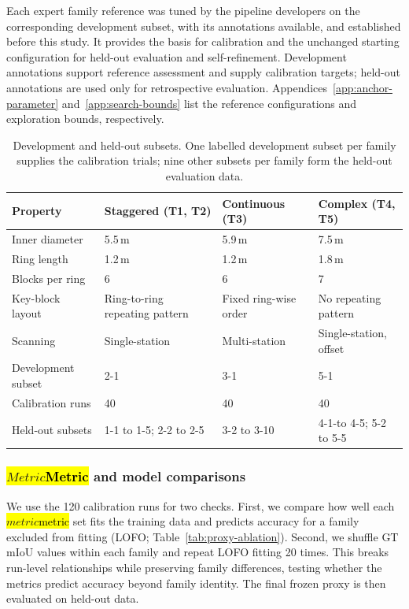 \documentclass[a4paper,fleqn]{cas-dc}
\let\texthl\hl
\renewcommand{\hl}[1]{\ifmmode\colorbox{yellow}{\ensuremath{#1}}\else\texthl{#1}\fi}
\begin{document}
Each expert family reference was tuned by the pipeline developers on the corresponding development subset, with its annotations available, and established before this study. It provides the basis for calibration and the unchanged starting configuration for held-out evaluation and self-refinement. Development annotations support reference assessment and supply calibration targets; held-out annotations are used only for retrospective evaluation. Appendices~\ref{app:anchor-parameter} and~\ref{app:search-bounds} list the reference configurations and exploration bounds, respectively.

\begin{table}[t]
\caption{Development and held-out subsets. One labelled development subset per family supplies the calibration trials; nine other subsets per family form the held-out evaluation data.}
\label{tab:dataset}
\centering
\begin{tabular}{p{} p{} p{} p{}}
\toprule
Property & Staggered (T1, T2) & Continuous (T3) & Complex (T4, T5) \\
\midrule
Inner diameter & 5.5\,m & 5.9\,m & 7.5\,m \\
Ring length & 1.2\,m & 1.2\,m & 1.8\,m \\
Blocks per ring & 6 & 6 & 7 \\
Key-block layout & Ring-to-ring repeating pattern & Fixed ring-wise order & No repeating pattern \\
Scanning & Single-station & Multi-station & Single-station, offset \\
Development subset & 2-1 & 3-1 & 5-1 \\
Calibration runs & 40 & 40 & 40 \\
Held-out subsets & 1-1 to 1-5; 2-2 to 2-5 & 3-2 to 3-10 & 4-1-to 4-5; 5-2 to 5-5 \\
\bottomrule
\end{tabular}
\end{table}


\subsubsection{\hl{Metric} and model comparisons}
\label{sec:comparators}

We use the 120 calibration runs for two checks. First, we compare how well each \hl{metric} set fits the training data and predicts accuracy for a family excluded from fitting (LOFO; Table~\ref{tab:proxy-ablation}). Second, we shuffle GT mIoU values within each family and repeat LOFO fitting 20 times. This breaks run-level relationships while preserving family differences, testing whether the metrics predict accuracy beyond family identity. The final frozen proxy is then evaluated on held-out data.
\end{document}
